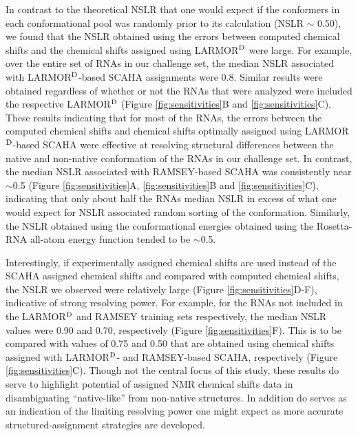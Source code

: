\documentclass[journal=jcisd8,manuscript=article,layout=onecolumn]{achemso}
\begin{document}
In contrast to the theoretical NSLR that one would expect if the conformers in each conformational pool was randomly prior to its calculation (NSLR $\sim$ 0.50), we found that the NSLR obtained using the errors between computed chemical shifts and the chemical shifts assigned using LARMOR$^{\rm D}$ were large. For example, over the entire set of RNAs in our challenge set, the median NSLR associated with LARMOR$^{\rm D}$-based SCAHA assignments were 0.8. Similar results were obtained regardless of whether or not the RNAs that were analyzed were included the respective LARMOR$^{\rm D}$ (Figure \ref{fig:sensitivities}B and \ref{fig:sensitivities}C).  These results indicating that for most of the RNAs, the errors between the computed chemical shifts and  chemical shifts optimally assigned using LARMOR$^{\rm D}$-based SCAHA were effective at resolving structural differences between the native and non-native conformation of the RNAs in our challenge set.  In contrast, the median NSLR associated with RAMSEY-based SCAHA was consistently near $\sim$0.5 (Figure  \ref{fig:sensitivities}A, \ref{fig:sensitivities}B and \ref{fig:sensitivities}C), indicating that only about half the RNAs median NSLR in excess of what one would expect for NSLR associated random sorting of the conformation. Similarly, the NSLR obtained using the conformational energies obtained using the Rosetta-RNA all-atom energy function\cite{alford2017rosetta} tended to be $\sim$0.5.

Interestingly, if experimentally assigned chemical shifts are used instead of the SCAHA assigned chemical shifts and compared with computed chemical shifts, the NSLR we observed were relatively large (Figure  \ref{fig:sensitivities}D-F), indicative of strong resolving power. For example, for the RNAs not included in the LARMOR$^{\rm D}$ and RAMSEY training sets respectively, the median NSLR values were 0.90 and 0.70, respectively (Figure  \ref{fig:sensitivities}F). This is to be compared with values of 0.75 and 0.50 that are obtained using chemical shifts assigned with LARMOR$^{\rm D}$- and RAMSEY-based SCAHA, respectively (Figure  \ref{fig:sensitivities}C). Though not the central focus of this study, these results do serve to highlight potential of assigned NMR chemical shifts data in disambiguating ``native-like'' from non-native structures. In addition do serves as an indication of the limiting resolving power one might expect as more accurate structured-assignment strategies are developed.
\end{document}
